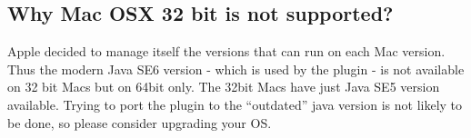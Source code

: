 \documentclass[10pt]{article}
\begin{document}
\subsection{Why Mac OSX 32 bit is not supported?}
Apple decided to manage itself the versions that can run on each Mac version. Thus the modern Java SE6 version - which is used by the plugin - is not available on 32 bit Macs but on 64bit only. The 32bit Macs have just Java SE5 version available. Trying to port the plugin to the ``outdated'' java version is not likely to be done, so please consider upgrading your OS.
\end{document}
